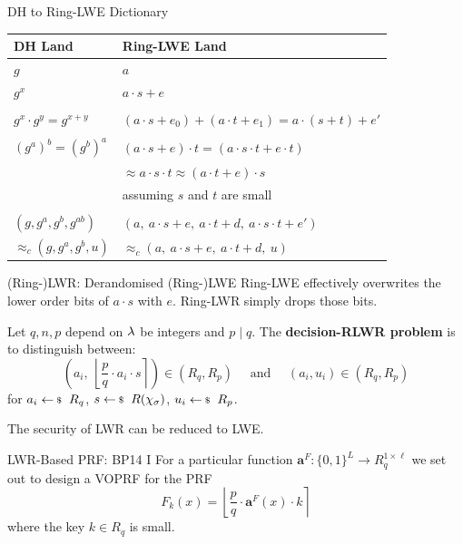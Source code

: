 \documentclass[xcolor=table,10pt,aspectratio=169]{beamer}
\begin{document}
\begin{frame}[label={sec:org8347acc}]{DH to Ring-LWE Dictionary}
\begin{center}
\begin{tabular}{ll}
DH Land & Ring-LWE Land\\
\hline
\(g\) & \(a\)\\
\(g^x\) & \(a\cdot s + e\)\\
 & \\
\(g^x \cdot g^y = g^{x+y}\) & \((a\cdot s + e_0) + (a \cdot t + e_1) = a \cdot (s+t) + e'\)\\
 & \\
\((g^a)^b = (g^b)^a\) & \((a\cdot s + e)\cdot t = (a\cdot s \cdot t + e \cdot t)\)\\
 & \(\approx a\cdot s \cdot t \approx (a\cdot t + e)\cdot s\)\\
 & assuming \(s\) and \(t\) are small\\
 & \\
\((g, g^a, g^b, g^{ab})\) & \((a,\ a\cdot s + e,\ a\cdot t + d,\ a \cdot s \cdot t + e')\)\\
\(\approx_c (g, g^a, g^b, u)\) & \(\approx_c (a,\ a\cdot s + e,\ a\cdot t + d,\ u)\)\\
\end{tabular}

\end{center}
\end{frame}

\begin{frame}[label={sec:org332728c}]{(Ring-)LWR: Derandomised (Ring-)LWE}
Ring-LWE effectively overwrites the lower order bits of \(a\cdot s\) with \(e\). Ring-LWR simply drops those bits.

\begin{definition}
  Let \(q,n,p\) depend on \(\lambda\) be integers and \(p \mid q\). The \textbf{decision-RLWR problem} is to distinguish between:
  \[
  {\left(a_i,\ \left\lfloor \frac{p}{q} \cdot a_i \cdot s \right\rceil\right)} \in {(R_q,R_p)} \quad \text{ and }\quad  {(a_i,u_i)} \in {(R_q,R_p)}
  \]
  for \(a_i \sample R_q\), \(s \sample R(\chi_\sigma)\), \(u_i \sample R_p\).
\end{definition}

The security of LWR can be reduced to LWE.
\end{frame}

\begin{frame}[label={sec:org6fcdebc}]{LWR-Based PRF: BP14 I}
For a particular function \(\mathbf{a}^F: {\{0,1\}}^L \rightarrow R_q^{1\times \ell}\) we set out to design a VOPRF for the PRF 
\[
F_k(x) = \left\lfloor \frac{p}{q} \cdot \mathbf{a}^F(x) \cdot k \right\rceil
\] 
where the key \(k \in R_q\) is small.

\begin{block}{}
\end{block}
\end{frame}
\end{document}
